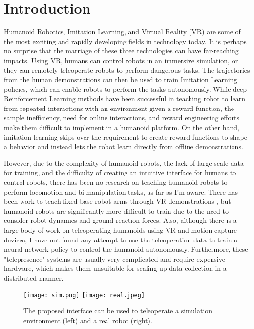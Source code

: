 \chapter{Introduction}


Humanoid Robotics, Imitation Learning, and Virtual Reality (VR) are some of the most exciting and rapidly developing fields in technology today. It is perhaps no surprise that the marriage of these three technologies can have far-reaching impacts. Using VR, humans can control robots in an immersive simulation, or they can remotely teleoperate robots to perform dangerous tasks. The trajectories from the human demonstrations can then be used to train Imitation Learning policies, which can enable robots to perform the tasks autonomously. While deep Reinforcement Learning methods have been successful in teaching robot to learn from repeated interactions with an environment given a reward function, the sample inefficiency, need for online interactions, and reward engineering efforts make them difficult to implement in a humanoid platform. On the other hand, imitation learning skips over the requirement to create reward functions to shape a behavior and instead lets the robot learn directly from offline demonstrations.

However, due to the complexity of humanoid robots, the lack of large-scale data for training, and the difficulty of creating an intuitive interface for humans to control robots, there has been no research on teaching humanoid robots to perform locomotion and bi-manipulation tasks, as far as I'm aware. There has been work to teach fixed-base robot arms through VR demonstrations \cite{zhang2018deep}, but humanoid robots are significantly more difficult to train due to the need to consider robot dynamics and ground reaction forces. Also, although there is a large body of work on teleoperating humanoids using VR and motion capture devices, I have not found any attempt to use the teleoperation data to train a neural network policy to control the humanoid autonomously. Furthermore, these "telepresence" systems are usually very complicated and require expensive hardware, which makes them unsuitable for scaling up data collection in a distributed manner.

\begin{figure}
	\centering
	\texttt{[image: sim.png]}
	\texttt{[image: real.jpeg]}
	\caption{The proposed interface can be used to teleoperate a simulation environment (left) and a real robot (right).}
    \label{fig:simreal}
\end{figure}

